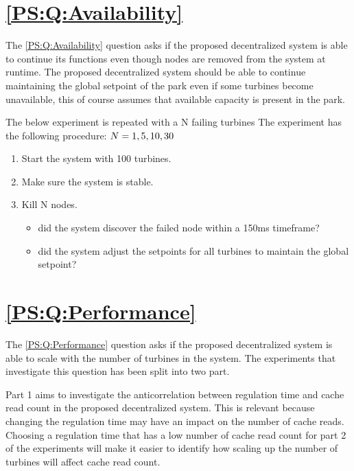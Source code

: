 \section{\ref{PS:Q:Availability}}
The \ref{PS:Q:Availability} question asks if the proposed decentralized system is able to continue its functions even though nodes are removed from the system at runtime.
The proposed decentralized system should be able to continue maintaining the global setpoint of the park even if some turbines become unavailable, this of course assumes that available capacity is present in the park.

The below experiment is repeated with a N failing turbines
The experiment has the following procedure:
$N = 1, 5, 10, 30$
\begin{enumerate}
	\item Start the system with 100 turbines.
	\item Make sure the system is stable.
	\item Kill N nodes.
	\begin{itemize}
		\item did the system discover the failed node within a 150ms timeframe?
		\item did the system adjust the setpoints for all turbines to maintain the global setpoint?
	\end{itemize}
\end{enumerate}


\section{\ref{PS:Q:Performance}}
\label{sec:Exper:perfom}


The \ref{PS:Q:Performance} question asks if the proposed decentralized system is able to scale with the number of turbines in the system. The experiments that investigate this question has been split into two part. \newline

Part 1 aims to investigate the anticorrelation between regulation time and cache read count in the proposed decentralized system. This is relevant because changing the regulation time may have an impact on the number of cache reads. Choosing a regulation time that has a low number of cache read count for part 2 of the experiments will make it easier to identify how scaling up the number of turbines will affect cache read count. \newline

